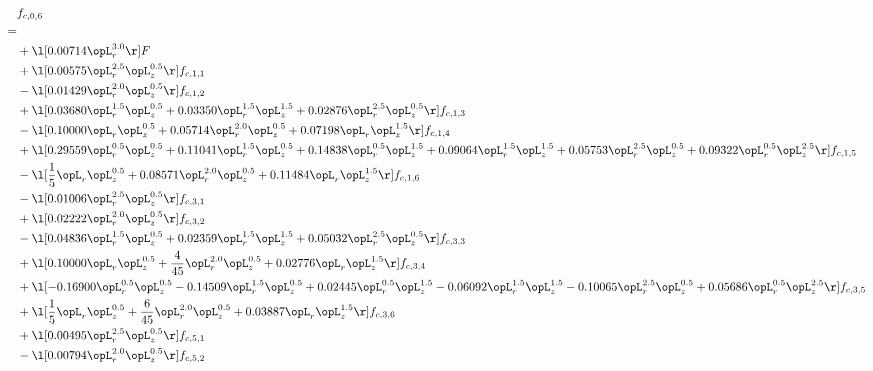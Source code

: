 \begin{alignat}{2} 
\label{eq:f_06_2} 
& f_{c,0,6} \nonumber \\ 
 = \\ 
& + \l[  0.00714 \opL_r^{3.0}  \r] F \nonumber \\ 
& + \l[  0.00575 \opL_r^{2.5} \opL_z^{0.5}  \r] f_{c,1,1} \nonumber \\ 
& - \l[  0.01429 \opL_r^{2.0} \opL_z^{0.5}  \r] f_{c,1,2} \nonumber \\ 
& + \l[  0.03680 \opL_r^{1.5} \opL_z^{0.5} +  0.03350 \opL_r^{1.5} \opL_z^{1.5} +  0.02876 \opL_r^{2.5} \opL_z^{0.5}  \r] f_{c,1,3} \nonumber \\ 
& - \l[  0.10000 \opL_r \opL_z^{0.5} +  0.05714 \opL_r^{2.0} \opL_z^{0.5} +  0.07198 \opL_r \opL_z^{1.5}  \r] f_{c,1,4} \nonumber \\ 
& + \l[  0.29559 \opL_r^{0.5} \opL_z^{0.5} +  0.11041 \opL_r^{1.5} \opL_z^{0.5} +  0.14838 \opL_r^{0.5} \opL_z^{1.5} +  0.09064 \opL_r^{1.5} \opL_z^{1.5} +  0.05753 \opL_r^{2.5} \opL_z^{0.5} +  0.09322 \opL_r^{0.5} \opL_z^{2.5}  \r] f_{c,1,5} \nonumber \\ 
& - \l[ \frac{1}{5} \opL_r \opL_z^{0.5} +  0.08571 \opL_r^{2.0} \opL_z^{0.5} +  0.11484 \opL_r \opL_z^{1.5}  \r] f_{c,1,6} \nonumber \\ 
& - \l[  0.01006 \opL_r^{2.5} \opL_z^{0.5}  \r] f_{c,3,1} \nonumber \\ 
& + \l[  0.02222 \opL_r^{2.0} \opL_z^{0.5}  \r] f_{c,3,2} \nonumber \\ 
& - \l[  0.04836 \opL_r^{1.5} \opL_z^{0.5} +  0.02359 \opL_r^{1.5} \opL_z^{1.5} +  0.05032 \opL_r^{2.5} \opL_z^{0.5}  \r] f_{c,3,3} \nonumber \\ 
& + \l[  0.10000 \opL_r \opL_z^{0.5} + \frac{4}{45} \opL_r^{2.0} \opL_z^{0.5} +  0.02776 \opL_r \opL_z^{1.5}  \r] f_{c,3,4} \nonumber \\ 
& + \l[  -0.16900 \opL_r^{0.5} \opL_z^{0.5}   -0.14509 \opL_r^{1.5} \opL_z^{0.5} +  0.02445 \opL_r^{0.5} \opL_z^{1.5}   -0.06092 \opL_r^{1.5} \opL_z^{1.5}   -0.10065 \opL_r^{2.5} \opL_z^{0.5} +  0.05686 \opL_r^{0.5} \opL_z^{2.5}  \r] f_{c,3,5} \nonumber \\ 
& + \l[ \frac{1}{5} \opL_r \opL_z^{0.5} + \frac{6}{45} \opL_r^{2.0} \opL_z^{0.5} +  0.03887 \opL_r \opL_z^{1.5}  \r] f_{c,3,6} \nonumber \\ 
& + \l[  0.00495 \opL_r^{2.5} \opL_z^{0.5}  \r] f_{c,5,1} \nonumber \\ 
& - \l[  0.00794 \opL_r^{2.0} \opL_z^{0.5}  \r] f_{c,5,2} \nonumber \\ 

\end{alignat}
